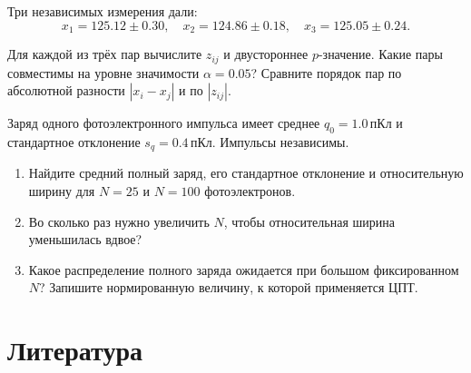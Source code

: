 \documentclass[
  russian,
  11pt,
  a4paper,
  open=any]{scrbook}
\providecommand{\tightlist}{%
  \setlength{\itemsep}{0pt}\setlength{\parskip}{0pt}}
\begin{document}
\begin{semanticpdfbox}[colback=BookCoralSoft,borderline west={1.2mm}{0pt}{BookCoral}]

\par\nopagebreak[4]\vspace{1.2mm}

Три независимых измерения дали: \[
x_1=125.12\pm0.30,\quad
x_2=124.86\pm0.18,\quad
x_3=125.05\pm0.24.
\]

Для каждой из трёх пар вычислите \(z_{ij}\) и двустороннее
\(p\)-значение. Какие пары совместимы на уровне значимости
\(\alpha=0.05\)? Сравните порядок пар по абсолютной разности
\(|x_i-x_j|\) и по \(|z_{ij}|\).

\end{semanticpdfbox}

\begin{semanticpdfbox}[colback=BookCoralSoft,borderline west={1.2mm}{0pt}{BookCoral}]

\par\nopagebreak[4]\vspace{1.2mm}

Заряд одного фотоэлектронного импульса имеет среднее
\(q_0=1.0\,\text{пКл}\) и стандартное отклонение
\(s_q=0.4\,\text{пКл}\). Импульсы независимы.

\begin{enumerate}
\def\labelenumi{\arabic{enumi}.}
\tightlist
\item
  Найдите средний полный заряд, его стандартное отклонение и
  относительную ширину для \(N=25\) и \(N=100\) фотоэлектронов.
\item
  Во сколько раз нужно увеличить \(N\), чтобы относительная ширина
  уменьшилась вдвое?
\item
  Какое распределение полного заряда ожидается при большом фиксированном
  \(N\)? Запишите нормированную величину, к которой применяется ЦПТ.
\end{enumerate}

\end{semanticpdfbox}

\section*{Литература}\label{ux43bux438ux442ux435ux440ux430ux442ux443ux440ux430-3}
\end{document}
